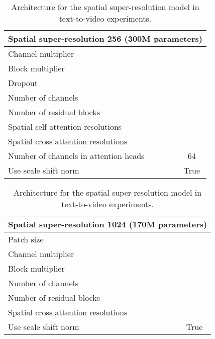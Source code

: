 \documentclass[10pt,twocolumn,letterpaper]{article}
\begin{document}
\newpage

\begin{table}[!ht]
    \centering
    \caption{Architecture for the spatial super-resolution model in text-to-video experiments.}
    \vspace{-1mm}
    \label{tab:text2video_arch_sr256}
    \begin{tabular}{l c}
        \toprule
        \multicolumn{2}{c}{Spatial super-resolution 256 (300M parameters)}\\
        \midrule
        Channel multiplier &  \\
        Block multiplier &  \\
        Dropout &  \\
        Number of channels &  \\
        Number of residual blocks &  \\
        Spatial self attention resolutions &  \\
        Spatial cross attention resolutions &  \\
        Number of channels in attention heads & 64\\
        Use scale shift norm & True \\
        \bottomrule
    \end{tabular}
\end{table}

\begin{table}[!ht]
    \centering
    \caption{Architecture for the spatial super-resolution model in text-to-video experiments.}
    \vspace{-1mm}
    \label{tab:text2video_arch_sr1024}
    \begin{tabular}{l c}
        \toprule
        \multicolumn{2}{c}{Spatial super-resolution 1024 (170M parameters)}\\
        \midrule
        Patch size &  \\
        Channel multiplier &  \\
        Block multiplier &  \\
        Number of channels &  \\
        Number of residual blocks &  \\
        Spatial cross attention resolutions &  \\
        Use scale shift norm & True \\
        \bottomrule
    \end{tabular}
\end{table}  \clearpage
{\small


}
\end{document}

